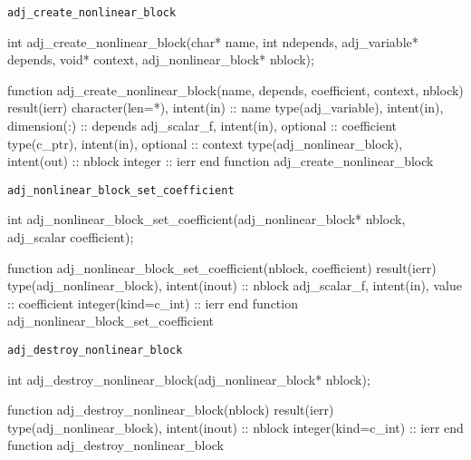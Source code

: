 \begin{boxwithtitle}{\texttt{adj_create_nonlinear_block}}
\begin{minipage}{\columnwidth}
\begin{ccode}
  int adj_create_nonlinear_block(char* name, int ndepends, adj_variable* depends, 
                                 void* context, adj_nonlinear_block* nblock);
\end{ccode}
\begin{fortrancode}
  function adj_create_nonlinear_block(name, depends, coefficient, context, nblock) 
           result(ierr)
    character(len=*), intent(in) :: name
    type(adj_variable), intent(in), dimension(:) :: depends
    adj_scalar_f, intent(in), optional :: coefficient
    type(c_ptr), intent(in), optional :: context
    type(adj_nonlinear_block), intent(out) :: nblock
    integer :: ierr
  end function adj_create_nonlinear_block
\end{fortrancode}
\end{minipage}
\end{boxwithtitle}


\begin{boxwithtitle}{\texttt{adj_nonlinear_block_set_coefficient}}
\begin{minipage}{\columnwidth}
\begin{ccode}
  int adj_nonlinear_block_set_coefficient(adj_nonlinear_block* nblock, 
                                          adj_scalar coefficient);
\end{ccode}
\begin{fortrancode}
  function adj_nonlinear_block_set_coefficient(nblock, coefficient) result(ierr) 
    type(adj_nonlinear_block), intent(inout) :: nblock
    adj_scalar_f, intent(in), value :: coefficient
    integer(kind=c_int) :: ierr
  end function adj_nonlinear_block_set_coefficient
\end{fortrancode}
\end{minipage}
\end{boxwithtitle}


\begin{boxwithtitle}{\texttt{adj_destroy_nonlinear_block}}
\begin{minipage}{\columnwidth}
\begin{ccode}
  int adj_destroy_nonlinear_block(adj_nonlinear_block* nblock);
\end{ccode}
\begin{fortrancode}
  function adj_destroy_nonlinear_block(nblock) result(ierr)
    type(adj_nonlinear_block), intent(inout) :: nblock
    integer(kind=c_int) :: ierr
  end function adj_destroy_nonlinear_block
\end{fortrancode}
\end{minipage}
\end{boxwithtitle}

